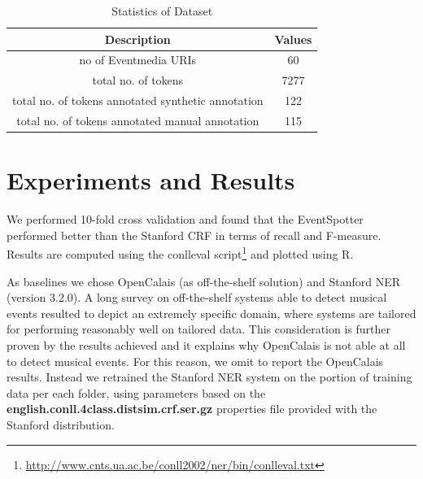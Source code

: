 \documentclass[10pt,a4paper]{article}
\begin{document}
\begin{table}[h]
\centering %
\begin{tabular}{c c } %
\hline %
Description & Values \\ [0.5ex] %
\hline\hline %
no of Eventmedia URIs & 60  \\
total no. of tokens & 7277  \\
total no. of tokens annotated synthetic annotation & 122  \\
total no. of tokens annotated manual annotation & 115  \\
\hline %
\end{tabular}
\caption{Statistics of Dataset} %
\label{tab:manual} %
\end{table}

\section{Experiments and Results}
We performed 10-fold cross validation and found that the EventSpotter performed better than the Stanford CRF in terms of recall and F-measure. Results are computed using the conlleval script\footnote{\url{http://www.cnts.ua.ac.be/conll2002/ner/bin/conlleval.txt}} and plotted using R.

As baselines we chose OpenCalais (as off-the-shelf solution) and Stanford NER (version 3.2.0).
A long survey on off-the-shelf systems able to detect musical events resulted to depict an extremely specific domain, where systems are tailored for performing reasonably well on tailored data. This consideration is further proven by the results achieved and it explains why OpenCalais is not able at all to detect musical events. For this reason, we omit to report the OpenCalais results.
Instead we retrained the Stanford NER system on the portion of training data per each folder, using parameters based on the \textbf{english.conll.4class.distsim.crf.ser.gz} properties file provided with the Stanford distribution.
\end{document}
